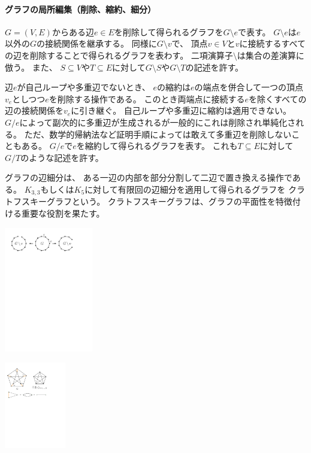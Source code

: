 \begin{paracol}{2}
\paragraph{グラフの局所編集（削除、縮約、細分）}
$G=(V, E)$からある辺$e \in E$を削除して得られるグラフを$G\setminus e$で表す。
$G\setminus e$は$e$以外の$G$の接続関係を継承する。
同様に$G\setminus v$で、
頂点$v\in V$と$v$に接続するすべての辺を削除することで得られるグラフを表わす。
二項演算子$\setminus$は集合の差演算に倣う。
また、
$S \subseteq V$や$T \subseteq E$に対して$G\setminus S$や$G\setminus T$の記述を許す。

辺$e$が自己ループや多重辺でないとき、
$e$の縮約は$e$の端点を併合して一つの頂点$v_e$としつつ$e$を削除する操作である。
このとき両端点に接続する$e$を除くすべての辺の接続関係を$v_e$に引き継ぐ。
自己ループや多重辺に縮約は適用できない。
$G / e$によって副次的に多重辺が生成されるが一般的にこれは削除され単純化される。
ただ、数学的帰納法など証明手順によっては敢えて多重辺を削除しないこともある。
$G / e$で$e$を縮約して得られるグラフを表す。
これも$T\subseteq E$に対して$G / T$のような記述を許す。

グラフの辺細分は、
ある一辺の内部を部分分割して二辺で置き換える操作である。
$K_{3,3}$もしくは$K_5$に対して有限回の辺細分を適用して得られるグラフを
クラトフスキーグラフという。
クラトフスキーグラフは、グラフの平面性を特徴付ける重要な役割を果たす。

\switchcolumn
\vspace{1.5\intextsep}
\centering
\includegraphics[width=0.29\textwidth]{figures/deleting.pdf}

\vspace{1.5\intextsep}
\includegraphics[width=0.20\textwidth]{figures/edge_contractions.pdf}


\end{paracol}
